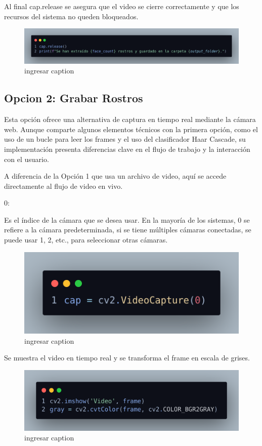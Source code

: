 \documentclass[12pt]{article}
\begin{document}
{Al final cap.release se asegura que el video se cierre correctamente y que los recursos del sistema no queden bloqueados.

\begin{figure}[h]
    \centering
    \includegraphics[width=1.0\linewidth]{imagenes/des10.png}
    \caption{ingresar caption}
    \label{fig:enter-label}
\end{figure}

\subsection{Opcion 2: Grabar Rostros}
Esta opción ofrece una alternativa de captura en tiempo real mediante la cámara web. Aunque comparte algunos elementos técnicos con la primera opción, como el uso de un bucle para leer los frames y el uso del clasificador Haar Cascade, su implementación presenta diferencias clave en el flujo de trabajo y la interacción con el usuario.

A diferencia de la Opción 1 que usa un archivo de video, aquí se accede directamente al flujo de video en vivo.

\begin{itemize}
    {\bfseries\item 0:} Es el índice de la cámara que se desea usar. En la mayoría de los sistemas, 0 se refiere a la cámara predeterminada, si se tiene múltiples cámaras conectadas, se puede usar 1, 2, etc., para seleccionar otras cámaras.
\end{itemize}

\begin{figure}[h]
    \centering
    \includegraphics[width=0.5\linewidth]{imagenes/des11.png}
    \caption{ingresar caption}
    \label{fig:enter-label}
\end{figure}

Se muestra el video en tiempo real y se transforma el frame en escala de grises.

\begin{figure}[h]
    \centering
    \includegraphics[width=0.75\linewidth]{imagenes/des12.png}
    \caption{ingresar caption}
    \label{fig:enter-label}
\end{figure}

}
\end{document}
